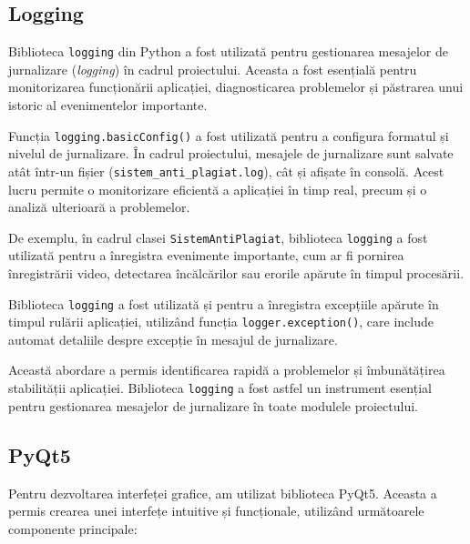 \documentclass[12pt,a4paper]{article}
\begin{document}
\subsection{Logging}
Biblioteca \texttt{logging}\cite{logging} din Python a fost utilizată pentru gestionarea mesajelor de jurnalizare (\textit{logging}) în cadrul proiectului. Aceasta a fost esențială pentru monitorizarea funcționării aplicației, diagnosticarea problemelor și păstrarea unui istoric al evenimentelor importante.

Funcția \texttt{logging.basicConfig()} a fost utilizată pentru a configura formatul și nivelul de jurnalizare. În cadrul proiectului, mesajele de jurnalizare sunt salvate atât într-un fișier (\texttt{sistem\_anti\_plagiat.log}), cât și afișate în consolă. Acest lucru permite o monitorizare eficientă a aplicației în timp real, precum și o analiză ulterioară a problemelor.

De exemplu, în cadrul clasei \texttt{SistemAntiPlagiat}, biblioteca \texttt{logging} a fost utilizată pentru a înregistra evenimente importante, cum ar fi pornirea înregistrării video, detectarea încălcărilor sau erorile apărute în timpul procesării.

Biblioteca \texttt{logging} a fost utilizată și pentru a înregistra excepțiile apărute în timpul rulării aplicației, utilizând funcția \texttt{logger.exception()}, care include automat detaliile despre excepție în mesajul de jurnalizare.

Această abordare a permis identificarea rapidă a problemelor și îmbunătățirea stabilității aplicației. Biblioteca \texttt{logging} a fost astfel un instrument esențial pentru gestionarea mesajelor de jurnalizare în toate modulele proiectului.

\subsection{PyQt5}
Pentru dezvoltarea interfeței grafice, am utilizat biblioteca PyQt5\cite{pyqt5}. Aceasta a permis crearea unei interfețe intuitive și funcționale, utilizând următoarele componente principale:
\end{document}

